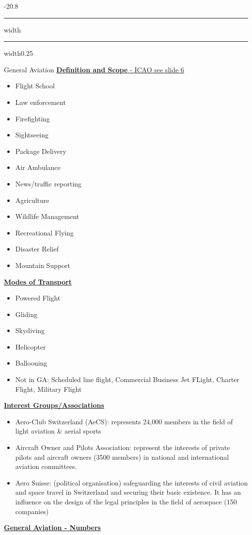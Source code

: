 \documentclass[9pt, landscape, fleqn]{scrartcl}
\makeatletter
\renewcommand{\section}{\@startsection{section}{1}{0mm}%
{-2\baselineskip}{0.8\baselineskip}%
{\hrule depth 0.2pt width\columnwidth\hrule depth1.5pt
width0.25\columnwidth\vspace*{1.2em}\Large\bfseries\rmfamily}}
\makeatother
\begin{document}
\begin{multicols*}{3}
\section{General Aviation}
\underline{\textbf{Definition and Scope} - ICAO see slide 6}
\begin{itemize}
    \item Flight School
    \item Law enforcement 
    \item Firefighting
    \item Sightseeing
    \item Package Delivery 
    \item Air Ambulance 
    \item News/traffic reporting 
    \item Agriculture 
    \item Wildlife Management 
    \item Recreational Flying 
    \item Disaster Relief 
    \item Mountain Support 
\end{itemize}
\underline{\textbf{Modes of Transport}}
\begin{itemize}
    \item Powered Flight 
    \item Gliding
    \item Skydiving
    \item Helicopter
    \item Ballooning 
    \item Not in GA: Scheduled line flight, Commercial Business Jet FLight, Charter Flight, Military Flight
\end{itemize}
\underline{\textbf{Interest Groups/Associations}}
\begin{itemize}
    \item Aero-Club Switzerland (AeCS): represents 24,000 members in the field of light aviation \& aerial sports
    \item Aircraft Owner and Pilots Association: represent the interests of private pilots and aircraft owners (3500 members) in national and international aviation committees.
    \item Aero Suisse: (political organisation) safeguarding the interests of civil aviation and space travel in Switzerland and securing their basic existence. It has an influence on the design of the legal principles in the field of aerospace (150 companies)
\end{itemize}
\underline{\textbf{General Aviation - Numbers}}

\end{multicols*}
\end{document}

